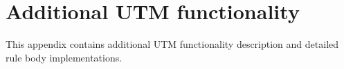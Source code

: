 \cleardoublepage

\chapter{Additional UTM functionality}
\noindent This appendix contains additional UTM functionality description and detailed rule body implementations.

